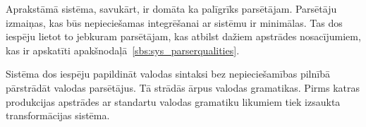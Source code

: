 Aprakstāmā sistēma, savukārt, ir domāta ka palīgrīks parsētājam. Parsētāju izmaiņas, kas būs nepieciešamas integrēšanai ar sistēmu ir minimālas. Tas dos iespēju lietot to jebkuram parsētājam, kas atbilst dažiem apstrādes nosacījumiem, kas ir apskatīti apakšnodaļā~\ref{sbs:sys_parserqualities}.

Sistēma dos iespēju papildināt valodas sintaksi bez nepieciešamības pilnībā pārstrādāt valodas parsētājus. Tā strādās ārpus valodas gramatikas. Pirms katras produkcijas apstrādes ar standartu valodas gramatiku likumiem tiek izsaukta transformācijas sistēma. 